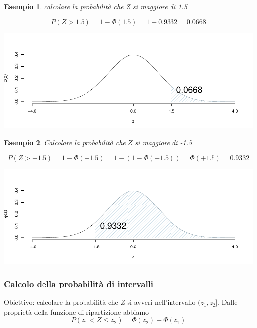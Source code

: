 \documentclass[
  11pt,
]{book}
\theoremstyle{mytheoremstyle}
\theoremstyle{mydefstyle}
\newtheorem{example}{{Esempio}}[section]
\begin{document}
\begin{example}

calcolare la probabilità che \(Z\) si maggiore di 1.5

\[P(Z > 1.5) = 1-\Phi(1.5)=1-0.9332=0.0668\]

\begin{center}\includegraphics{Appunti_di_Statistica_2025_files/figure-latex/07c-Normale-17-1} \end{center}

\end{example}

\begin{example}

Calcolare la probabilità che \(Z\) si maggiore di -1.5

\[P(Z > -1.5) = 1-\Phi(-1.5)=1-(1-\Phi(+1.5))=\Phi(+1.5)=0.9332\]

\begin{center}\includegraphics{Appunti_di_Statistica_2025_files/figure-latex/07c-Normale-19-1} \end{center}

\end{example}

\subsubsection{Calcolo della probabilità di intervalli}\label{calcolo-della-probabilituxe0-di-intervalli}

Obiettivo: calcolare la probabilità che \(Z\) si avveri nell'intervallo \((z_1,z_2]\).
Dalle proprietà della funzione di ripartizione abbiamo
\[P(z_1<Z\leq z_2) = \Phi(z_2)-\Phi(z_1)\]
\end{document}
